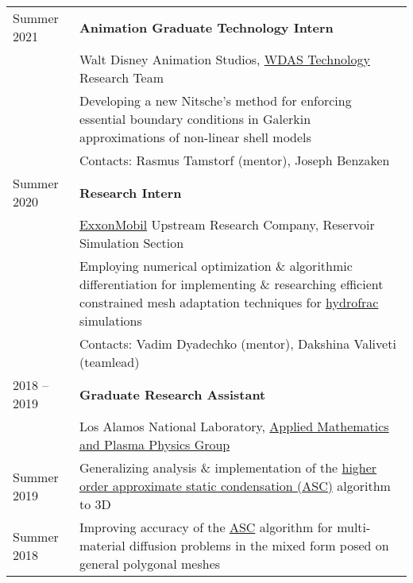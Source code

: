 \documentclass[a4paper,12pt]{article}
\begin{document}
	\begin{longtable}{ l >{\raggedright\arraybackslash}p{15cm} }
		Summer 2021
			& \textbf{Animation Graduate Technology Intern}\vspace{1mm}\\
			& Walt Disney Animation Studios, \href{https://www.disneyanimation.com/technology/}{WDAS Technology} Research Team\vspace{1mm}\\
			& Developing a new Nitsche's method for enforcing essential boundary conditions in Galerkin approximations of non-linear shell models\vspace{1mm}\\
			& Contacts: Rasmus Tamstorf (mentor), Joseph Benzaken\vspace{3mm}\\
		Summer 2020
			& \textbf{Research Intern}\vspace{1mm}\\
			& \href{https://corporate.exxonmobil.com/}{ExxonMobil} Upstream Research Company, Reservoir Simulation Section\vspace{1mm}\\
			& Employing numerical optimization \& algorithmic differentiation for implementing \& researching efficient constrained mesh adaptation techniques for \href{https://en.wikipedia.org/wiki/Hydraulic_fracturing}{hydrofrac} simulations\vspace{1mm}\\
			& Contacts: Vadim Dyadechko (mentor), Dakshina Valiveti (teamlead) \vspace{3mm}\\			
		2018 -- 2019
			& \textbf{Graduate Research Assistant}\vspace{1mm}\\
			& Los Alamos National Laboratory, \href{https://www.lanl.gov/org/ddste/aldsc/theoretical/applied-mathematics-plasma-physics/index.php}{Applied Mathematics and Plasma Physics Group}\vspace{1mm}\\
		Summer 2019
			& Generalizing analysis \& implementation of the \href{https://www.researchgate.net/publication/330912268_A_higher_order_approximate_static_condensation_method_for_multi-material_diffusion_problems}{higher order approximate static condensation (ASC)} algorithm to 3D\vspace{1mm}\\
		Summer 2018
			& Improving accuracy of the \href{https://www.researchgate.net/publication/318300724_Approximate_static_condensation_algorithm_for_solving_multi-material_diffusion_problems_on_meshes_non-aligned_with_material_interfaces}{ASC} algorithm for multi-material diffusion problems in the mixed form posed on general polygonal meshes\vspace{1mm}\\

\end{longtable}
\end{document}
